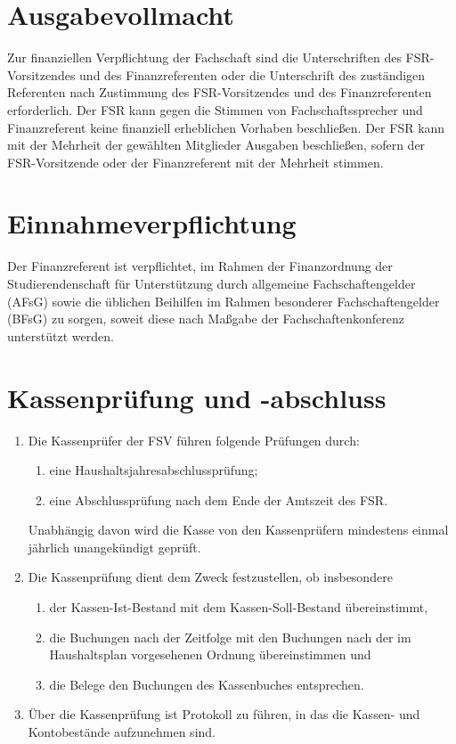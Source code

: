 \documentclass{article}
\begin{document}
\section{Ausgabevollmacht}
Zur finanziellen Verpflichtung der Fachschaft sind die Unterschriften des FSR-Vorsitzendes und des Finanzreferenten oder die Unterschrift des zuständigen Referenten nach Zustimmung des FSR-Vorsitzendes und des Finanzreferenten erforderlich. Der FSR kann gegen die Stimmen von Fachschaftssprecher und Finanzreferent keine finanziell erheblichen Vorhaben beschließen. Der FSR kann mit der Mehrheit der gewählten Mitglieder Ausgaben beschließen, sofern der FSR-Vorsitzende oder der Finanzreferent mit der Mehrheit stimmen.

\section{Einnahmeverpflichtung}
Der Finanzreferent ist verpflichtet, im Rahmen der Finanzordnung der Studierendenschaft für Unterstützung durch allgemeine Fachschaftengelder (AFsG) sowie die üblichen Beihilfen im Rahmen besonderer Fachschaftengelder (BFsG) zu sorgen, soweit diese nach Maßgabe der Fachschaftenkonferenz unterstützt werden.

\section{Kassenprüfung und -abschluss}
\begin{enumerate}[(1)]
    \item Die Kassenprüfer der FSV führen folgende Prüfungen durch:
    \begin{enumerate}[1.]
        \item eine Haushaltsjahresabschlussprüfung;
        \item eine Abschlussprüfung nach dem Ende der Amtszeit des FSR.
    \end{enumerate}
    Unabhängig davon wird die Kasse von den Kassenprüfern mindestens einmal jährlich unangekündigt geprüft. 
    \item Die Kassenprüfung dient dem Zweck festzustellen, ob insbesondere
    \begin{enumerate}[1.]
        \item der Kassen-Ist-Bestand mit dem Kassen-Soll-Bestand übereinstimmt,
        \item die Buchungen nach der Zeitfolge mit den Buchungen nach der im Haushaltsplan vorgesehenen Ordnung übereinstimmen und
        \item die Belege den Buchungen des Kassenbuches entsprechen.
    \end{enumerate}
    \item Über die Kassenprüfung ist Protokoll zu führen, in das die Kassen- und Kontobestände aufzunehmen sind.
\end{enumerate}
\end{document}
